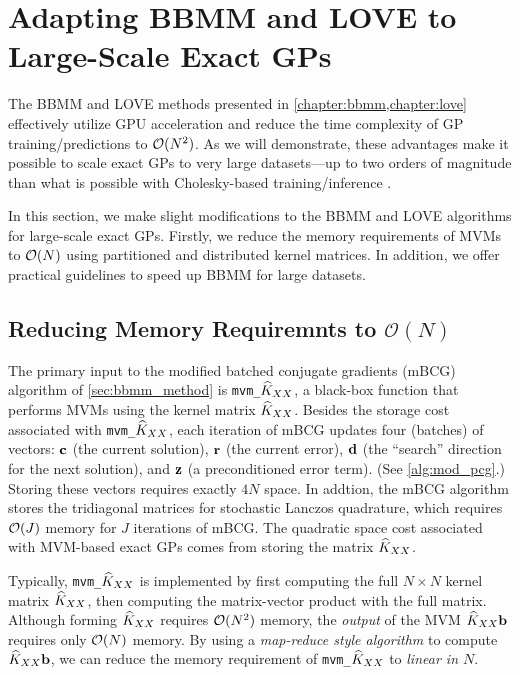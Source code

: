 \section{Adapting BBMM and LOVE to Large-Scale Exact GPs}
\label{sec:largeexact_method}

The BBMM and LOVE methods presented in \cref{chapter:bbmm,chapter:love} effectively utilize GPU acceleration and reduce the time complexity of GP training/predictions to $\bigo{N^2}$.
As we will demonstrate, these advantages make it possible to scale exact GPs to very large datasets---up to two orders of magnitude than what is possible with Cholesky-based training/inference \cite{nguyen2019exact}.

In this section, we make slight modifications to the BBMM and LOVE algorithms for large-scale exact GPs.
Firstly, we reduce the memory requirements of MVMs to $\bigo{N}$ using partitioned and distributed kernel matrices.
In addition, we offer practical guidelines to speed up BBMM for large datasets.




\subsection{Reducing Memory Requiremnts to $\mathcal{O}(N)$}

The primary input to the modified batched conjugate gradients (mBCG) algorithm of \cref{sec:bbmm_method} is {\tt mvm\_$\widehat{K}_{XX}$}, a black-box function that performs MVMs using the kernel matrix $\widehat{K}_{XX}$.
Besides the storage cost associated with {\tt mvm\_$\widehat{K}_{XX}$}, each iteration of mBCG updates four (batches) of vectors: $\mathbf{c}$ (the current solution), $\mathbf{r}$ (the current error), $\mathbf{d}$ (the ``search'' direction for the next solution), and $\mathbf{z}$ (a preconditioned error term).
(See \cref{alg:mod_pcg}.)
Storing these vectors requires exactly $4N$ space.
In addtion, the mBCG algorithm stores the tridiagonal matrices for stochastic Lanczos quadrature, which requires $\bigo{J}$ memory for $J$ iterations of mBCG.
The quadratic space cost associated with MVM-based exact GPs comes from storing the matrix $\widehat{K}_{XX}$.

Typically, {\tt mvm\_$\widehat{K}_{XX}$} is implemented by first computing the full $N \times N$ kernel matrix $\widehat{K}_{XX}$, then computing the matrix-vector product with the full matrix.
Although forming $\widehat{K}_{XX}$ requires $\bigo{N^2}$ memory, the \emph{output} of the MVM $\widehat{K}_{XX} \mathbf{b}$ requires only $\bigo{N}$ memory.
By using a \emph{map-reduce style algorithm} to compute $\widehat{K}_{XX} \mathbf{b}$, we can reduce the memory requirement of {\tt mvm\_$\widehat{K}_{XX}$} to \emph{linear in $N$}.

